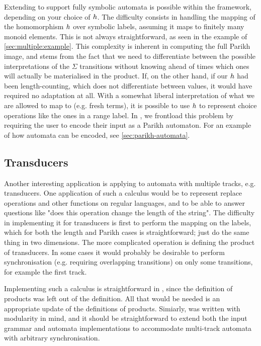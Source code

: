 Extending \Calculus{} to support fully symbolic automata is possible within the
framework, depending on your choice of $h$. The difficulty consists in
handling the mapping of the homomorphism $h$ over symbolic labels, assuming
it maps to finitely many monoid elements. This is not always straightforward, as
seen in the example of \cref{sec:multiple:example}. This complexity is inherent
in computing the full Parikh image, and stems from the fact that we need to
differentiate between the possible interpretations of the $\Sigma$ transitions
without knowing ahead of times which ones will actually be materialised in the
product. If, on the other hand, if our $h$ had been length-counting, which
does not differentiate between values, it would have required no adaptation at
all. With a somewhat liberal interpretation of what we are allowed to map to
(e.g. fresh terms), it is possible to use $h$ to represent choice operations
like the ones in a range label. In \Catra{}, we frontload this problem by
requiring the user to encode their input as a Parikh automaton. For an example of how automata can be encoded, see \cref{sec:parikh-automata}.

\iffalse
\subsection{Transducers}\label{sec:ext:transducers}

Another interesting application is applying \Calculus{} to automata with
multiple tracks, e.g. transducers. One application of such a calculus would be
to represent replace operations and other functions on regular languages, and to
be able to answer questions like "does this operation change the length of the
string". The difficulty in implementing it for transducers is first to perform
the mapping on the labels, which for both the length and Parikh cases is
straightforward; just do the same thing in two dimensions. The more complicated
operation is defining the product of transducers. In some cases it would
probably be desirable to perform synchronisation (e.g. requiring overlapping
transitions) on only some transitions, for example the first track.

Implementing such a calculus is straightforward in \Calculus, since the
definition of products was left out of the definition. All that would be needed
is an appropriate update of the definitions of products. Simiarly, \Catra was
written with modularity in mind, and it should be straightforward to extend both
the input grammar and automata implementations to accommodate multi-track
automata with arbitrary synchronisation.

